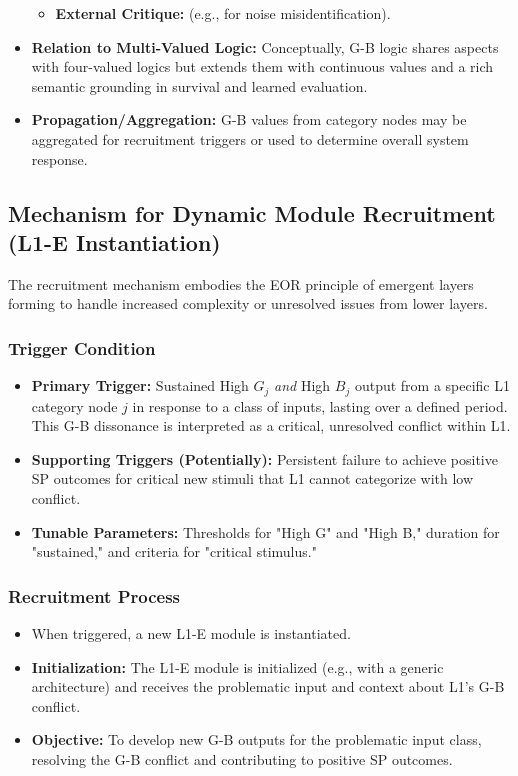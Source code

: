 \documentclass{article}
\begin{document}
\begin{itemize}
\begin{itemize}
        \item \textbf{External Critique:} (e.g., for noise misidentification).
    \end{itemize}
    \item \textbf{Relation to Multi-Valued Logic:} Conceptually, G-B logic shares aspects with four-valued logics but extends them with continuous values and a rich semantic grounding in survival and learned evaluation.
    \item \textbf{Propagation/Aggregation:} G-B values from category nodes may be aggregated for recruitment triggers or used to determine overall system response.
\end{itemize}

\subsection{Mechanism for Dynamic Module Recruitment (L1-E Instantiation)}
The recruitment mechanism embodies the EOR principle of emergent layers forming to handle increased complexity or unresolved issues from lower layers.

\subsubsection{Trigger Condition}
\begin{itemize}
    \item \textbf{Primary Trigger:} Sustained High $G_j$ \textit{and} High $B_j$ output from a specific L1 category node $j$ in response to a class of inputs, lasting over a defined period. This G-B dissonance is interpreted as a critical, unresolved conflict within L1.
    \item \textbf{Supporting Triggers (Potentially):} Persistent failure to achieve positive SP outcomes for critical new stimuli that L1 cannot categorize with low conflict.
    \item \textbf{Tunable Parameters:} Thresholds for "High G" and "High B," duration for "sustained," and criteria for "critical stimulus."
\end{itemize}

\subsubsection{Recruitment Process}
\begin{itemize}
    \item When triggered, a new L1-E module is instantiated.
    \item \textbf{Initialization:} The L1-E module is initialized (e.g., with a generic architecture) and receives the problematic input and context about L1's G-B conflict.
    \item \textbf{Objective:} To develop new G-B outputs for the problematic input class, resolving the G-B conflict and contributing to positive SP outcomes.
\end{itemize}
\end{document}

